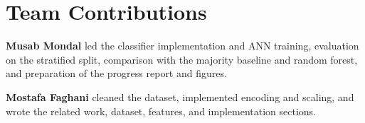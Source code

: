 \documentclass[11pt]{article}
\begin{document}
\section*{Team Contributions}

\noindent\textbf{Musab Mondal} led the classifier implementation and ANN training, evaluation on the stratified split, comparison with the majority baseline and random forest, and preparation of the progress report and figures.

\noindent\textbf{Mostafa Faghani} cleaned the dataset, implemented encoding and scaling, and wrote the related work, dataset, features, and implementation sections.


\clearpage

\end{document}
